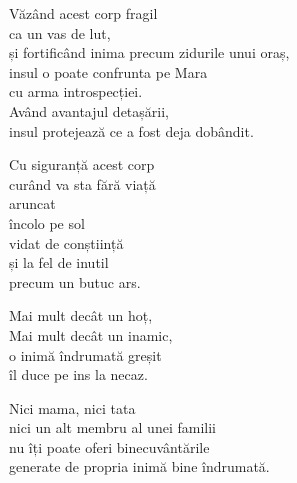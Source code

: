 Văzând acest corp fragil\\
ca un vas de lut,\\
și fortificând inima precum zidurile unui oraș,\\
insul o poate confrunta pe Mara\\
cu arma introspecției.\\
Având avantajul detașării,\\
insul protejează ce a fost deja dobândit.


Cu siguranță acest corp\\
curând va sta fără viață\\
aruncat\\
încolo pe sol\\
vidat de conștiință\\
și la fel de inutil\\
precum un butuc ars.


Mai mult decât un hoț,\\
Mai mult decât un inamic,\\
o inimă îndrumată greșit\\
îl duce pe ins la necaz.


Nici mama, nici tata\\
nici un alt membru al unei familii\\
nu îți poate oferi binecuvântările\\
generate de propria inimă bine îndrumată.

